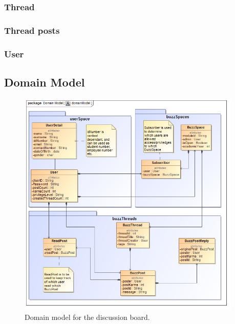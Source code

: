 \documentclass [a4paper,12pt] {article}
\begin{document}
		\subsubsection{Thread}
		\subsubsection{Thread posts}
		\subsubsection{User}

\pagebreak
	\subsection{Domain Model}
		\begin{figure}[H]
			\centering
			\includegraphics[width=0.95\textwidth]{domainModel.png}
			\caption{Domain model for the discussion board.}
		\end{figure}
\end{document}
